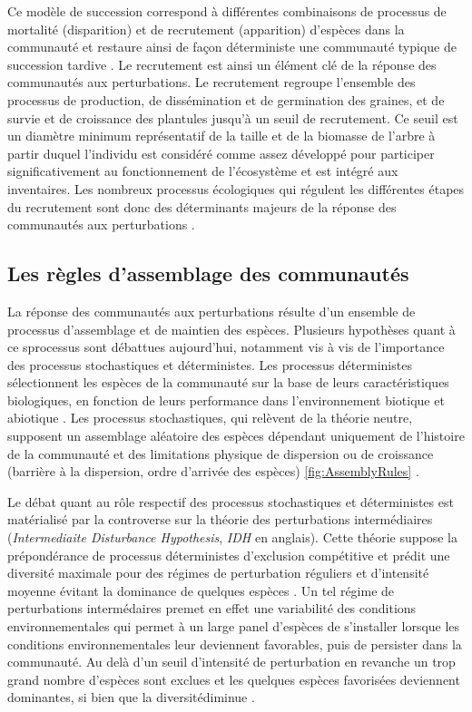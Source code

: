 \documentclass[
  11pt,
  french,
  A4paper,
  extrafontsizes,onecolumn,openright
  ]{memoir}
\begin{document}
Ce modèle de succession correspond à différentes combinaisons de
processus de mortalité (disparition) et de recrutement (apparition)
d'espèces dans la communauté et restaure ainsi de façon déterministe une
communauté typique de succession tardive \autocite{Denslow2000}. Le
recrutement est ainsi un élément clé de la réponse des communautés aux
perturbations. Le recrutement regroupe l'ensemble des processus de
production, de dissémination et de germination des graines, et de survie
et de croissance des plantules jusqu'à un seuil de recrutement. Ce seuil
est un diamètre minimum représentatif de la taille et de la biomasse de
l'arbre à partir duquel l'individu est considéré comme assez développé
pour participer significativement au fonctionnement de l'écosystème et
est intégré aux inventaires. Les nombreux processus écologiques qui
régulent les différentes étapes du recrutement sont donc des
déterminants majeurs de la réponse des communautés aux perturbations
\autocites{Denslow1980}{Schnitzer2001}{Asner2004}.

\subsection{Les règles d'assemblage des
communautés}\label{les-regles-dassemblage-des-communautes}

La réponse des communautés aux perturbations résulte d'un ensemble de
processus d'assemblage et de maintien des espèces. Plusieurs hypothèses
quant à ce sprocessus sont débattues aujourd'hui, notamment vis à vis de
l'importance des processus stochastiques et déterministes. Les processus
déterministes sélectionnent les espèces de la communauté sur la base de
leurs caractéristiques biologiques, en fonction de leurs performance
dans l'environnement biotique et abiotique \autocite{Molino2001}. Les
processus stochastiques, qui relèvent de la théorie neutre, supposent un
assemblage aléatoire des espèces dépendant uniquement de l'histoire de
la communauté et des limitations physique de dispersion ou de croissance
(barrière à la dispersion, ordre d'arrivée des espèces)
\ref{fig:AssemblyRules} \autocite{Hubbell2001}.

Le débat quant au rôle respectif des processus stochastiques et
déterministes est matérialisé par la controverse sur la théorie des
perturbations intermédiaires (\emph{Intermediaite Disturbance
Hypothesis}, \emph{IDH} en anglais). Cette théorie suppose la
prépondérance de processus déterministes d'exclusion compétitive et
prédit une diversité maximale pour des régimes de perturbation réguliers
et d'intensité moyenne évitant la dominance de quelques espèces
\autocite{Molino2001}. Un tel régime de perturbations intermédaires
premet en effet une variabilité des conditions environnementales qui
permet à un large panel d'espèces de s'installer lorsque les conditions
environnementales leur deviennent favorables, puis de persister dans la
communauté. Au delà d'un seuil d'intensité de perturbation en revanche
un trop grand nombre d'espèces sont exclues et les quelques espèces
favorisées deviennent dominantes, si bien que la diversitédiminue
\autocites{Chesson2000}{Kariuki2006a}{Berry2008a}.
\end{document}
